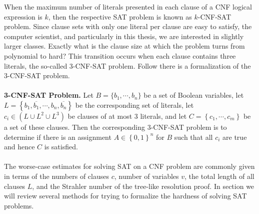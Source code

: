 When the maximum number of literals presented in each clause of a CNF logical expression is $k$, then the respective SAT problem is known as $k$-CNF-SAT problem. Since clause sets with only one literal per clause are easy to satisfy, the computer scientist, and particularly in this thesis, we are interested in slightly larger classes. Exactly what is the clause size at which the problem turns from polynomial to hard? This transition occurs when each clause contains three literals, the so-called $3$-CNF-SAT problem. Follow there is a formalization of the $3$-CNF-SAT problem.\\
\\
\noindent
\textbf{3-CNF-SAT Problem.} Let $B=\{b_1,\cdots,b_n\}$ be a set of Boolean variables, let $L=\left\{b_1,\overline{b_1},\cdots,b_n,\overline{b_n}\right\}$ be the corresponding set of literals, let $c_i\in \left(L\cup L^2\cup L^3\right)$ be clauses of at most 3 literals, and let $C=\left\{ c_1, \cdots, c_m\right\}$ be a set of these clauses. Then the corresponding 3-CNF-SAT problem is to determine if there is an assignment $A\in \left\{0,1\right\}^n$ for $B$ such that all $c_i$ are true and hence $C$ is satisfied.\\
\\
\noindent
The worse-case estimates for solving SAT on a CNF problem are commonly given in terms of the numbers of clauses $c$, number of variables $v$, the total length of all clauses $L$, and the Strahler number of the tree-like resolution proof. In section we will review several methods for trying to formalize the hardness of solving SAT problems.



